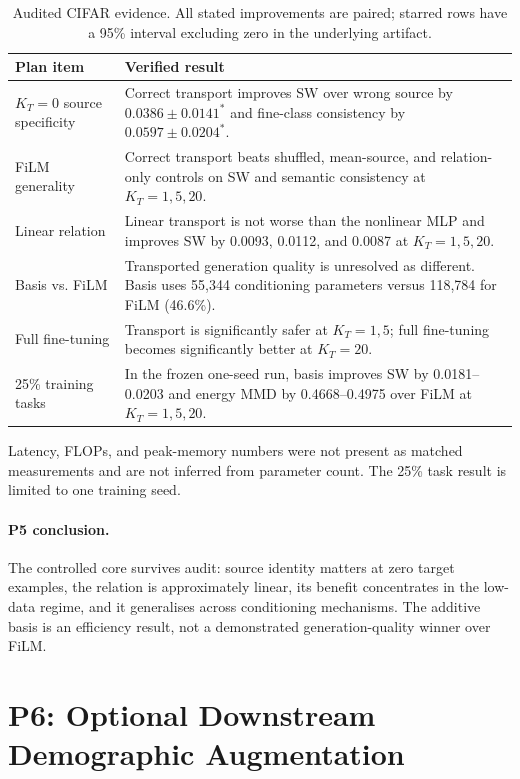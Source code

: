 \documentclass{article}
\newcommand{\KT}{K_T}
\newcommand{\sigstar}{^{*}}
\begin{document}
\begin{table}[h]
\caption{Audited CIFAR evidence.  All stated improvements are paired; starred rows have a
95\% interval excluding zero in the underlying artifact.}
\label{tab:p5}
\centering
\small
\begin{tabular}{p{}p{}}
\toprule
Plan item & Verified result \\
\midrule
$\KT=0$ source specificity & Correct transport improves SW over wrong source by $0.0386\pm0.0141\sigstar$ and fine-class consistency by $0.0597\pm0.0204\sigstar$. \\
FiLM generality & Correct transport beats shuffled, mean-source, and relation-only controls on SW and semantic consistency at $\KT=1,5,20$. \\
Linear relation & Linear transport is not worse than the nonlinear MLP and improves SW by 0.0093, 0.0112, and 0.0087 at $\KT=1,5,20$. \\
Basis vs. FiLM & Transported generation quality is unresolved as different.  Basis uses 55,344 conditioning parameters versus 118,784 for FiLM (46.6\%). \\
Full fine-tuning & Transport is significantly safer at $\KT=1,5$; full fine-tuning becomes significantly better at $\KT=20$. \\
25\% training tasks & In the frozen one-seed run, basis improves SW by 0.0181--0.0203 and energy MMD by 0.4668--0.4975 over FiLM at $\KT=1,5,20$. \\
\bottomrule
\end{tabular}
\end{table}

Latency, FLOPs, and peak-memory numbers were not present as matched measurements and are not
inferred from parameter count.  The 25\% task result is limited to one training seed.

\paragraph{P5 conclusion.}
The controlled core survives audit: source identity matters at zero target examples, the
relation is approximately linear, its benefit concentrates in the low-data regime, and it
generalises across conditioning mechanisms.  The additive basis is an efficiency result, not
a demonstrated generation-quality winner over FiLM.

\section{P6: Optional Downstream Demographic Augmentation}
\end{document}
